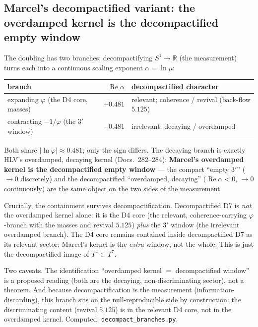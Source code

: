 \subsection{Marcel's decompactified variant: the overdamped kernel is the decompactified empty window}
The doubling has two branches; decompactifying $S^1\to\mathbb{R}$ (the measurement) turns each
into a continuous scaling exponent $\alpha=\ln\mu$:
\begin{center}\small\renewcommand{\arraystretch}{1.15}
\begin{tabular}{@{}l r l@{}}
\toprule
branch & $\operatorname{Re}\alpha$ & decompactified character \\
\midrule
expanding $\varphi$ (the D4 core, masses) & $+0.481$ & relevant; coherence / revival (back-flow $5.125$) \\
contracting $-1/\varphi$ (the $3'$ window) & $-0.481$ & irrelevant; decaying / overdamped \\
\bottomrule
\end{tabular}
\end{center}
\noindent Both share $|\ln\varphi|\approx0.481$; only the sign differs. The decaying branch is
exactly HLV's overdamped, decaying kernel (Docs.~282--284): \textbf{Marcel's overdamped kernel is
the decompactified empty window} --- the compact \enquote{empty $3'$} ($\to0$ discretely) and the
decompactified \enquote{overdamped, decaying} ($\operatorname{Re}\alpha<0$, $\to0$ continuously)
are the same object on the two sides of the measurement.

Crucially, the containment survives decompactification. Decompactified D7 is \emph{not} the
overdamped kernel alone: it is the D4 core (the relevant, coherence-carrying $\varphi$-branch with
the masses and revival $5.125$) \emph{plus} the $3'$ window (the irrelevant overdamped branch).
The D4 core remains contained inside decompactified D7 as its relevant sector; Marcel's kernel is
the \emph{extra} window, not the whole. This is just the decompactified image of $T^4\subset T^7$.

Two caveats. The identification \enquote{overdamped kernel $=$ decompactified window} is a
proposed reading (both are the decaying, non-discriminating sector), not a theorem. And because
decompactification is the measurement (information-discarding), this branch sits on the
null-reproducible side by construction: the discriminating content (revival $5.125$) is in the
relevant D4 core, not in the overdamped kernel. Computed: \texttt{decompact\_branches.py}.

